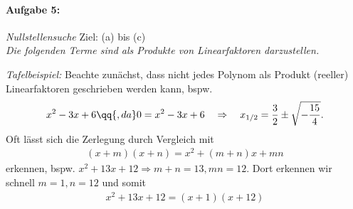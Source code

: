 \paragraph{Aufgabe 5: } \emph{Nullstellensuche} \hfill Ziel: (a) bis (c)\\[0.2cm]
\emph{Die folgenden Terme sind als Produkte von Linearfaktoren darzustellen.}

\emph{Tafelbeispiel:} Beachte zunächst, dass nicht jedes Polynom als Produkt (reeller) Linearfaktoren geschrieben werden kann, bspw. 
\begin{align}
    x^2 -3x +6 \qq{, da}  0=x^2 - 3x +6 \quad \Rightarrow \quad x_{1/2} = \frac{3}{2} \pm \sqrt{-\frac{15}{4}}.
\end{align}
Oft lässt sich die Zerlegung durch Vergleich mit 
\begin{align}
    (x+m)(x+n) = x^2 + (m+n)x + mn
\end{align}
erkennen, bspw. $x^2 +13 x + 12 \Rightarrow m+n = 13, mn = 12$. Dort erkennen wir schnell $m=1, n=12$ und somit 
\begin{align}
    x^2 +13x+12 = (x+1)(x+12)
\end{align} 
